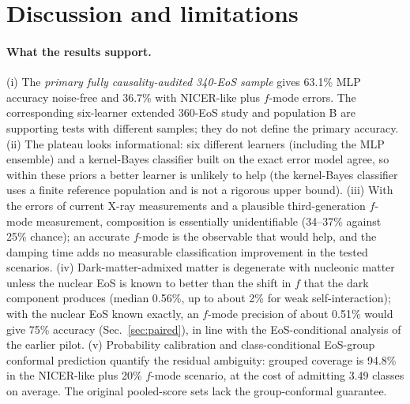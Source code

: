 \documentclass[11pt,a4paper]{article}
\begin{document}
\section{Discussion and limitations}
\paragraph{What the results support.} (i) The \emph{primary fully causality-audited 340-EoS sample} gives 63.1\% MLP accuracy noise-free and 36.7\% with NICER-like plus $f$-mode errors. The corresponding six-learner extended 360-EoS study and population B are supporting tests with different samples; they do not define the primary accuracy. (ii) The plateau looks informational: six different learners (including the MLP ensemble) and a kernel-Bayes classifier built on the exact error model agree, so within these priors a better learner is unlikely to help (the kernel-Bayes classifier uses a finite reference population and is not a rigorous upper bound). (iii) With the errors of current X-ray measurements and a plausible third-generation $f$-mode measurement, composition is essentially unidentifiable (34--37\% against 25\% chance); an accurate $f$-mode is the observable that would help, and the damping time adds no measurable classification improvement in the tested scenarios. (iv) Dark-matter-admixed matter is degenerate with nucleonic matter unless the nuclear EoS is known to better than the shift in $f$ that the dark component produces (median 0.56\%, up to about 2\% for weak self-interaction); with the nuclear EoS known exactly, an $f$-mode precision of about 0.51\% would give 75\% accuracy (Sec.~\ref{sec:paired}), in line with the EoS-conditional analysis of the earlier pilot. (v) Probability calibration and class-conditional EoS-group conformal prediction quantify the residual ambiguity: grouped coverage is 94.8\% in the NICER-like plus 20\% $f$-mode scenario, at the cost of admitting 3.49 classes on average. The original pooled-score sets lack the group-conformal guarantee.
\end{document}
